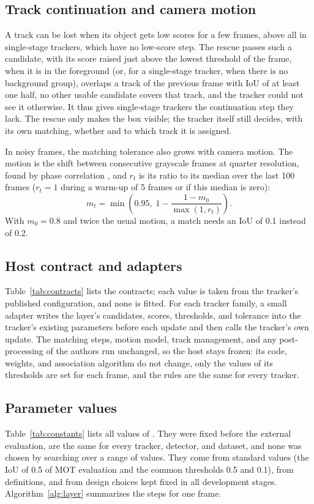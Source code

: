\subsection{Track continuation and camera motion}\label{sec:rescue}
A track can be lost when its object gets low scores for a few frames, above all in single-stage
trackers, which have no low-score step. The rescue passes such a candidate, with its score raised
just above the lowest threshold of the frame, when it is in the foreground (or, for a
single-stage tracker, when there is no background group), overlaps a track of the previous frame
with IoU of at least one half, no other usable candidate covers that track, and the tracker could
not see it otherwise. It thus gives single-stage trackers the continuation step they lack. The
rescue only makes the box visible; the tracker itself still decides, with its own matching,
whether and to which track it is assigned.

In noisy frames, the matching tolerance also grows with camera motion. The motion is the shift
between consecutive grayscale frames at quarter resolution, found by phase correlation
\cite{reddy1996phasecorr}, and $r_t$ is its ratio to its median over the last 100 frames ($r_t=1$
during a warm-up of 5 frames or if this median is zero):
\begin{equation}
m_t=\min\!\left(0.95,\;1-\frac{1-m_0}{\max(1,r_t)}\right).
\label{eq:motion}
\end{equation}
With $m_0=0.8$ and twice the usual motion, a match needs an IoU of 0.1 instead of 0.2.

\subsection{Host contract and adapters}\label{sec:contract}
Table~\ref{tab:contracts} lists the contracts; each value is taken from the tracker's published
configuration, and none is fitted. For each tracker family, a small adapter writes the layer's
candidates, scores, thresholds, and tolerance into the tracker's existing parameters before each
update and then calls the tracker's own update. The matching steps, motion model, track
management, and any post-processing of the authors run unchanged, so the host stays frozen: its
code, weights, and association algorithm do not change, only the values of its thresholds are set
for each frame, and the rules are the same for every tracker.



\subsection{Parameter values}\label{sec:constants}
Table~\ref{tab:constants} lists all values of \scl{}. They were fixed before the external
evaluation, are the same for every tracker, detector, and dataset, and none was chosen by searching
over a range of values. They come from standard values (the IoU of 0.5 of MOT evaluation and the
common thresholds 0.5 and 0.1), from definitions, and from design choices kept fixed in all
development stages. Algorithm~\ref{alg:layer} summarizes the steps for one frame.

